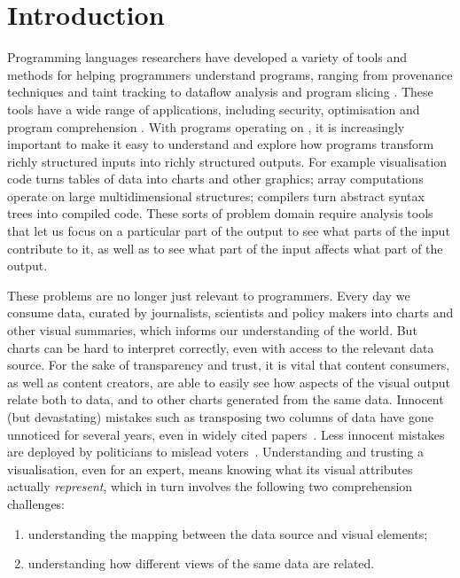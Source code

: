 \section{Introduction}

Programming languages researchers have developed a variety of tools and methods for helping programmers understand programs, ranging from provenance techniques and taint tracking to dataflow analysis and program slicing . These tools have a wide range of applications, including security, optimisation and program comprehension . With programs operating on , it is increasingly important to make it easy to understand and explore how programs transform richly structured inputs into richly structured outputs. For example visualisation code turns tables of data into charts and other graphics; array computations operate on large multidimensional structures; compilers turn abstract syntax trees into compiled code. These sorts of problem domain require analysis tools that let us focus on a particular part of the output to see what parts of the input contribute to it, as well as to see what part of the input affects what part of the output. 

These problems are no longer just relevant to programmers. Every day we consume data, curated by journalists, scientists and policy makers into charts and other visual summaries, which informs our understanding of the world. But charts can be hard to interpret correctly, even with access to the relevant data source. For the sake of transparency and trust, it is vital that content consumers, as well as content creators, are able to easily see how aspects of the visual output relate both to data, and to other charts generated from the same data. Innocent (but devastating) mistakes such as transposing two columns of data have gone unnoticed for several years, even in widely cited papers~\cite{miller06}. Less innocent mistakes are deployed by politicians to mislead voters~\cite{fullfact19}. Understanding and trusting a visualisation, even for an expert, means knowing what its visual attributes actually \emph{represent}, which in turn involves the following two comprehension challenges:

\begin{enumerate}
  \item understanding the mapping between the data source and visual elements;
  \item understanding how different views of the same data are related.
\end{enumerate}

